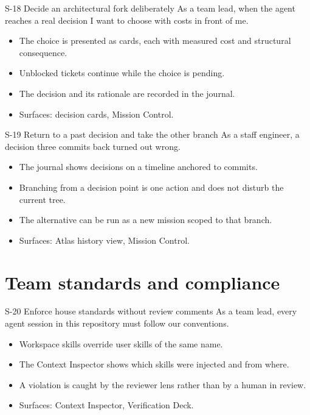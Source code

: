\begin{story}{S-18 \quad Decide an architectural fork deliberately}
As a team lead, when the agent reaches a real decision I want to choose with costs in front of me.
\end{story}
\begin{itemize}
  \item The choice is presented as cards, each with measured cost and structural consequence.
  \item Unblocked tickets continue while the choice is pending.
  \item The decision and its rationale are recorded in the journal.
  \item Surfaces: decision cards, Mission Control.
\end{itemize}

\begin{story}{S-19 \quad Return to a past decision and take the other branch}
As a staff engineer, a decision three commits back turned out wrong.
\end{story}
\begin{itemize}
  \item The journal shows decisions on a timeline anchored to commits.
  \item Branching from a decision point is one action and does not disturb the current tree.
  \item The alternative can be run as a new mission scoped to that branch.
  \item Surfaces: Atlas history view, Mission Control.
\end{itemize}

\section{Team standards and compliance}

\begin{story}{S-20 \quad Enforce house standards without review comments}
As a team lead, every agent session in this repository must follow our conventions.
\end{story}
\begin{itemize}
  \item Workspace skills override user skills of the same name.
  \item The Context Inspector shows which skills were injected and from where.
  \item A violation is caught by the reviewer lens rather than by a human in review.
  \item Surfaces: Context Inspector, Verification Deck.
\end{itemize}

